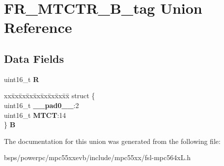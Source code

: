 \hypertarget{unionFR__MTCTR__16B__tag}{}\section{F\+R\+\_\+\+M\+T\+C\+T\+R\+\_\+B\+\_\+tag Union Reference}
\label{unionFR__MTCTR__16B__tag}
\subsection*{Data Fields}
\begin{DoxyCompactItemize}
\item 
\mbox{\label{unionFR__MTCTR__16B__tag_a6ead76beec49d7f5b5e3852dfa4e58d4}} 
uint16\+\_\+t {\bfseries R}
\item 
\mbox{\label{unionFR__MTCTR__16B__tag_a55bfcef014e3f75f1f79f15037da5573}} 
\begin{tabbing}
xx\=xx\=xx\=xx\=xx\=xx\=xx\=xx\=xx\=\kill
struct \{\\
\>uint16\_t {\bfseries \_\_pad0\_\_}:2\\
\>uint16\_t {\bfseries MTCT}:14\\
\} {\bfseries B}\\

\end{tabbing}\end{DoxyCompactItemize}


The documentation for this union was generated from the following file\+:\begin{DoxyCompactItemize}
\item 
bsps/powerpc/mpc55xxevb/include/mpc55xx/fsl-\/mpc564x\+L.\+h\end{DoxyCompactItemize}
